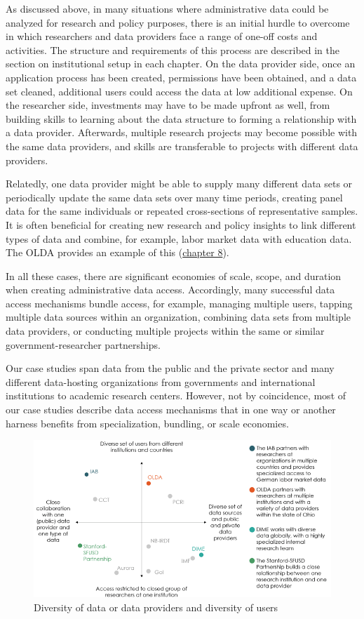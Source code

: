 \documentclass[
]{book}
\begin{document}
As discussed above, in many situations where administrative data could be analyzed for research and policy purposes, there is an initial hurdle to overcome in which researchers and data providers face a range of one-off costs and activities. The structure and requirements of this process are described in the section on institutional setup in each chapter. On the data provider side, once an application process has been created, permissions have been obtained, and a data set cleaned, additional users could access the data at low additional expense. On the researcher side, investments may have to be made upfront as well, from building skills to learning about the data structure to forming a relationship with a data provider. Afterwards, multiple research projects may become possible with the same data providers, and skills are transferable to projects with different data providers.

Relatedly, one data provider might be able to supply many different data sets or periodically update the same data sets over many time periods, creating panel data for the same individuals or repeated cross-sections of representative samples. It is often beneficial for creating new research and policy insights to link different types of data and combine, for example, labor market data with education data. The OLDA provides an example of this (\protect\hyperlink{olda}{chapter 8}).

In all these cases, there are significant economies of scale, scope, and duration when creating administrative data access. Accordingly, many successful data access mechanisms bundle access, for example, managing multiple users, tapping multiple data sources within an organization, combining data sets from multiple data providers, or conducting multiple projects within the same or similar government-researcher partnerships.

Our case studies span data from the public and the private sector and many different data-hosting organizations from governments and international institutions to academic research centers. However, not by coincidence, most of our case studies describe data access mechanisms that in one way or another harness benefits from specialization, bundling, or scale economies.

\begin{figure}
\centering
\includegraphics{./assets/intro/introfigure1web.png}
\caption{\label{fig:introfig1}Diversity of data or data providers and diversity of users}
\end{figure}
\end{document}
